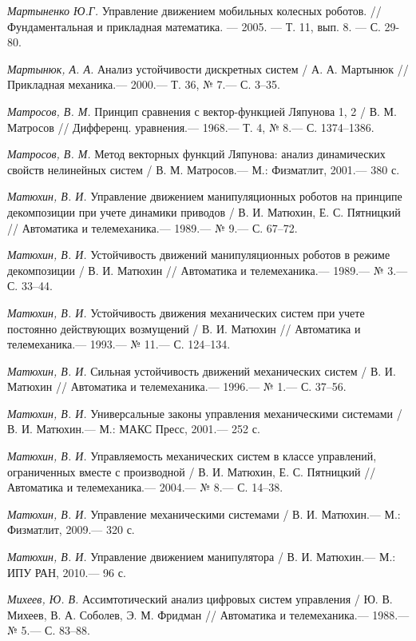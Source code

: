 \begin{thebibliography}{10}
	{\it Мартыненко Ю.Г.} Управление движением мобильных колесных роботов. // Фундаментальная и прикладная математика. — 2005. — Т. 11, вып. 8. — С. 29-80.
	
	
	{\it Мартынюк, А. А.} Анализ устойчивости дискретных систем / А. А. Мартынюк
	// Прикладная механика.— 2000.— Т. 36, № 7.— С. 3–35.
	
	{\it Матросов, В. М.} Принцип сравнения с вектор-функцией Ляпунова 1, 2 / В. М. Матросов
	// Дифференц. уравнения.— 1968.— Т. 4, № 8.— С. 1374–1386.
	
	{\it Матросов, В. М.} Метод векторных функций Ляпунова: анализ динамических свойств нелинейных систем / В. М. Матросов.— М.: Физматлит, 2001.— 380 с.
	
	{\it Матюхин, В. И.} Управление движением манипуляционных роботов на принципе декомпозиции при учете динамики приводов
	/ В. И. Матюхин, Е. С. Пятницкий // Автоматика и телемеханика.— 1989.— № 9.— С. 67–72.
	
	{\it Матюхин, В. И.} Устойчивость движений манипуляционных роботов в режиме декомпозиции
	/ В. И. Матюхин // Автоматика и телемеханика.— 1989.— № 3.— С. 33–44.
	
	{\it Матюхин, В. И.} Устойчивость движения механических систем при учете постоянно действующих возмущений
	/ В. И. Матюхин // Автоматика и телемеханика.— 1993.— № 11.— С. 124–134.
	
	{\it Матюхин, В. И.} Сильная устойчивость движений механических систем
	/ В. И. Матюхин // Автоматика и телемеханика.— 1996.— № 1.— С. 37–56.
	
	{\it Матюхин, В. И.} Универсальные законы управления механическими системами /
	В. И. Матюхин.— М.: МАКС Пресс, 2001.— 252 с.
	
	{\it Матюхин, В. И.} Управляемость механических систем в классе управлений, ограниченных вместе с производной
	/ В. И. Матюхин, Е. С. Пятницкий // Автоматика и телемеханика.— 2004.— № 8.— С. 14–38.
	
	{\it Матюхин, В. И.} Управление механическими системами / В. И. Матюхин.— М.: Физматлит,
	2009.— 320 с.
	
	{\it Матюхин, В. И.} Управление движением манипулятора / В. И. Матюхин.— М.: ИПУ
	РАН, 2010.— 96 с.
	
	{\it Михеев, Ю. В.} Ассимтотический анализ цифровых систем управления / Ю. В. Михеев, В. А. Соболев, Э. М. Фридман // Автоматика и телемеханика.— 1988.— № 5.— С. 83–88.
	

\end{thebibliography}
